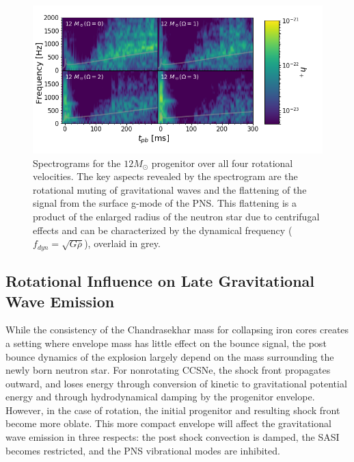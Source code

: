 \documentclass[twocolumn,times]{aastex62}  %
\begin{document}
\begin{figure}[t]
    \centering
    \includegraphics[scale=0.38]{figures/gws_2x2_line_M1.png}
    \caption{Spectrograms for the $12 M_\odot$ progenitor over all four rotational velocities.  The key aspects revealed by the spectrogram are the rotational muting of gravitational waves and the flattening of the signal from the surface g-mode of the PNS.  This flattening is a product of the enlarged radius of the neutron star due to centrifugal effects and can be characterized by the dynamical frequency ($f_{dyn} = \sqrt{G \overline{\rho}}$), overlaid in grey.}
    \label{fig:2x2}
\end{figure}


\subsection{Rotational Influence on Late Gravitational Wave Emission}


While the consistency of the Chandrasekhar mass for collapsing iron cores creates a setting where envelope mass has little effect on the bounce signal, the post bounce dynamics of the explosion largely depend on the mass surrounding the newly born neutron star.  For nonrotating CCSNe, the shock front propagates outward, and loses energy through conversion of kinetic to gravitational potential energy and through hydrodynamical damping by the progenitor envelope.  However, in the case of rotation, the initial progenitor and resulting shock front become more oblate.  This more compact envelope will affect the gravitational wave emission in three respects: the post shock convection is damped, the SASI becomes restricted, and the PNS vibrational modes are inhibited. 
\end{document}
